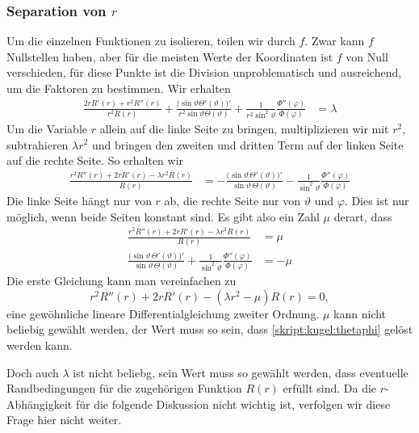 \subsubsection{Separation von $r$}
Um die einzelnen Funktionen zu isolieren, teilen wir durch $f$.
Zwar kann $f$ Nullstellen haben, aber für die meisten Werte der Koordinaten
ist $f$ von Null verschieden, für diese Punkte ist die Division unproblematisch
und ausreichend, um die Faktoren zu bestimmen.
Wir erhalten
\begin{align*}
\frac{2rR'(r)+r^2R''(r)}{r^2R(r)}
+
\frac{
\bigl(\sin\vartheta\Theta'(\vartheta)\bigr)'
}{r^2\sin\vartheta\Theta(\vartheta)}
+
\frac{1}{r^2\sin^2\vartheta}\frac{\Phi''(\varphi)}{\Phi(\varphi)}
&=\lambda
\end{align*}
Um die Variable $r$ allein auf die linke Seite zu bringen, multiplizieren wir
mit $r^2$, subtrahieren $\lambda r^2$ und bringen den zweiten und dritten 
Term auf der linken Seite auf die rechte Seite.
So erhalten wir
\begin{align*}
\frac{r^2R''(r)+2rR'(r)-\lambda r^2R(r)}{R(r)}
&=
-
\frac{
\bigl(\sin\vartheta\,\Theta'(\vartheta)\bigr)'
}{\sin\vartheta\,\Theta(\vartheta)}
-\frac{1}{\sin^2\vartheta}\frac{\Phi''(\varphi)}{\Phi(\varphi)}
\end{align*}
Die linke Seite hängt nur von $r$ ab, die rechte Seite nur von $\vartheta$
und $\varphi$.
Dies ist nur möglich, wenn beide Seiten konstant sind.
Es gibt also ein Zahl $\mu$ derart, dass
\begin{align}
\frac{r^2R''(r)+2rR'(r)-\lambda r^2R(r)}{R(r)}&=\mu
\\
\frac{\bigl(\sin\vartheta\,\Theta'(\vartheta)\bigr)'}{\sin\vartheta\,\Theta(\vartheta)}
+
\frac{1}{\sin^2\vartheta}\frac{\Phi''(\varphi)}{\Phi(\varphi)}
&=
-\mu
\label{skript:kugel:thetaphi}
\end{align}
Die erste Gleichung kann man vereinfachen zu
\begin{equation}
r^2R''(r)+2rR'(r)-(\lambda r^2-\mu)R(r) = 0,
\end{equation}
eine gewöhnliche lineare Differentialgleichung zweiter Ordnung.
$\mu$ kann nicht beliebig gewählt werden, der Wert muss so sein,
dass \eqref{skript:kugel:thetaphi} gelöst werden kann.

Doch auch $\lambda$ ist nicht beliebg, sein Wert muss so gewählt
werden, dass eventuelle Randbedingungen für die zugehörigen Funktion
$R(r)$ erfüllt sind.
Da die $r$-Abhängigkeit für die folgende Diskussion nicht wichtig ist,
verfolgen wir diese Frage hier nicht weiter.

